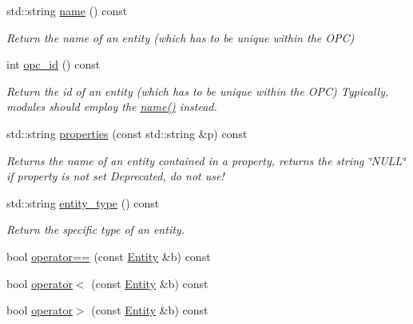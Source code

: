 \begin{DoxyCompactItemize}
std\+::string \hyperlink{group__icubclient__representations_a622173d0dec878783dcc31aafad49a97}{name} () const
\begin{DoxyCompactList}\small\item\em Return the name of an entity (which has to be unique within the O\+PC) \end{DoxyCompactList}\item 
int \hyperlink{group__icubclient__representations_afbc352dfc6eb9d896024403fdad3096d}{opc\+\_\+id} () const
\begin{DoxyCompactList}\small\item\em Return the id of an entity (which has to be unique within the O\+PC) Typically, modules should employ the \hyperlink{group__icubclient__representations_a622173d0dec878783dcc31aafad49a97}{name()} instead. \end{DoxyCompactList}\item 
std\+::string \hyperlink{group__icubclient__representations_a070b4a41c396c3740e5aec8a861436a6}{properties} (const std\+::string \&p) const
\begin{DoxyCompactList}\small\item\em Returns the name of an entity contained in a property, returns the string \char`\"{}\+N\+U\+L\+L\char`\"{} if property is not set Deprecated, do not use! \end{DoxyCompactList}\item 
std\+::string \hyperlink{group__icubclient__representations_a1795021c80c136ab0356d9aa58027c08}{entity\+\_\+type} () const
\begin{DoxyCompactList}\small\item\em Return the specific type of an entity. \end{DoxyCompactList}\item 
bool \hyperlink{group__icubclient__representations_a9a600b75d689669bd3c23995f438d002}{operator==} (const \hyperlink{group__icubclient__representations_classicubclient_1_1Entity}{Entity} \&b) const
\item 
bool \hyperlink{group__icubclient__representations_a84aba0d6b8447437f8bb042daf383957}{operator$<$} (const \hyperlink{group__icubclient__representations_classicubclient_1_1Entity}{Entity} \&b) const
\item 
bool \hyperlink{group__icubclient__representations_a2425ca69ea9fa4d2b31cc78c88d0c755}{operator$>$} (const \hyperlink{group__icubclient__representations_classicubclient_1_1Entity}{Entity} \&b) const
\end{DoxyCompactItemize}
